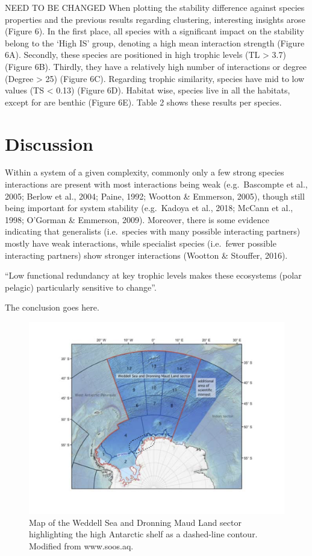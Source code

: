 \documentclass[gc, manuscript]{copernicus}
\begin{document}
NEED TO BE CHANGED When plotting the stability difference against
species properties and the previous results regarding clustering,
interesting insights arose (Figure 6). In the first place, all species
with a significant impact on the stability belong to the `High IS'
group, denoting a high mean interaction strength (Figure 6A). Secondly,
these species are positioned in high trophic levels (TL \textgreater{}
3.7) (Figure 6B). Thirdly, they have a relatively high number of
interactions or degree (Degree \textgreater{} 25) (Figure 6C). Regarding
trophic similarity, species have mid to low values (TS \textless{} 0.13)
(Figure 6D). Habitat wise, species live in all the habitats, except for
are benthic (Figure 6E). Table 2 shows these results per species.

\section{Discussion}

Within a system of a given complexity, commonly only a few strong
species interactions are present with most interactions being weak
(e.g.~Bascompte et al., 2005; Berlow et al., 2004; Paine, 1992; Wootton
\& Emmerson, 2005), though still being important for system stability
(e.g.~Kadoya et al., 2018; McCann et al., 1998; O'Gorman \& Emmerson,
2009). Moreover, there is some evidence indicating that generalists
(i.e.~species with many possible interacting partners) mostly have weak
interactions, while specialist species (i.e.~fewer possible interacting
partners) show stronger interactions (Wootton \& Stouffer, 2016).

``Low functional redundancy at key trophic levels makes these ecosystems
(polar pelagic) particularly sensitive to change''. \citep{Murphy2016}

\clearpage
\conclusions[Conclusions]

The conclusion goes here.

\clearpage

\begin{figure}
\includegraphics[width=12cm]{Fig.1_StudyMap} \caption{Map of the Weddell Sea and Dronning Maud Land sector highlighting the high Antarctic shelf as a dashed-line contour. Modified from www.soos.aq.}\label{fig:unnamed-chunk-1}
\end{figure}
\end{document}
